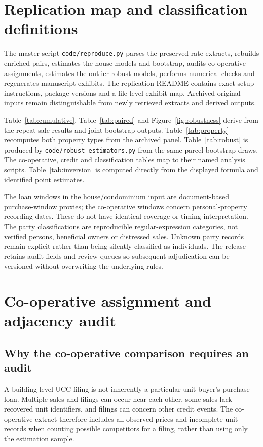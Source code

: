 \documentclass[12pt]{article}
\begin{document}
\section{Replication map and classification definitions}
The master script \texttt{code/reproduce.py} parses the preserved rate extracts, rebuilds enriched pairs, estimates the house models and bootstrap, audits co-operative assignments, estimates the outlier-robust models, performs numerical checks and regenerates manuscript exhibits. The replication README contains exact setup instructions, package versions and a file-level exhibit map. Archived original inputs remain distinguishable from newly retrieved extracts and derived outputs.

Table~\ref{tab:cumulative}, Table~\ref{tab:paired} and Figure~\ref{fig:robustness} derive from the repeat-sale results and joint bootstrap outputs. Table~\ref{tab:property} recomputes both property types from the archived panel. Table~\ref{tab:robust} is produced by \texttt{code/robust\_estimators.py} from the same parcel-bootstrap draws. The co-operative, credit and classification tables map to their named analysis scripts. Table~\ref{tab:inversion} is computed directly from the displayed formula and identified point estimates.

The loan windows in the house/condominium input are document-based purchase-window proxies; the co-operative windows concern personal-property recording dates. These do not have identical coverage or timing interpretation. The party classifications are reproducible regular-expression categories, not verified persons, beneficial owners or distressed sales. Unknown party records remain explicit rather than being silently classified as individuals. The release retains audit fields and review queues so subsequent adjudication can be versioned without overwriting the underlying rules.


\section{Co-operative assignment and adjacency audit}\label{sec:coopaudit}
\subsection{Why the co-operative comparison requires an audit}
A building-level UCC filing is not inherently a particular unit buyer's purchase loan. Multiple sales and filings can occur near each other, some sales lack recovered unit identifiers, and filings can concern other credit events. The co-operative extract therefore includes all observed prices and incomplete-unit records when counting possible competitors for a filing, rather than using only the estimation sample.
\end{document}
